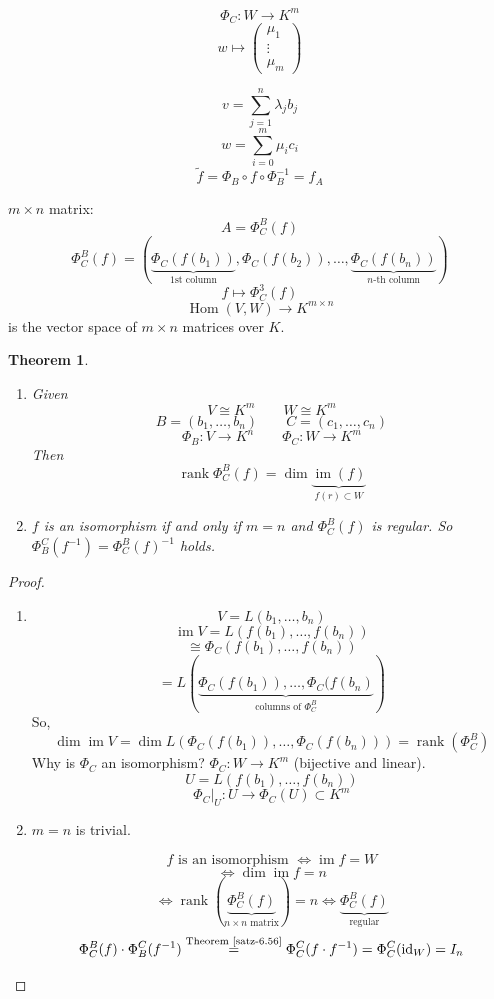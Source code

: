 \documentclass[a4paper,landscape,twocolumn]{article}
\newtheorem{theorem}{Theorem}
\DeclareMathOperator\Hom{Hom} %
\DeclareMathOperator\image{im} %
\DeclareMathOperator\rank{rank} %
\begin{document}
\[ \Phi_C: W \to K^m \]
\[ w \mapsto \begin{pmatrix} \mu_1 \\ \vdots \\ \mu_m \end{pmatrix} \]

\[ v = \sum_{j=1}^n \lambda_j b_j \]
\[ w = \sum_{i=0}^m \mu_i c_i \]
\[ \tilde{f} = \Phi_B \circ f \circ \Phi_B^{-1} = f_A \]

$m\times n$ matrix:
\[ A = \Phi_C^B(f) \]
\[
  \Phi_C^B(f) = \left(
    \underbrace{\Phi_C(f(b_1))}_{\text{1st column}},
    \Phi_C(f(b_2)),
    \ldots,
    \underbrace{\Phi_C(f(b_n))}_{\text{$n$-th column}}
  \right)
\]
\[ f \mapsto \Phi_C^3(f) \]
\[ \Hom(V, W) \to K^{m\times n} \]
is the vector space of $m\times n$ matrices over $K$.

\begin{theorem}
  \label{satz-6.57}
  \begin{enumerate}
    \item
      Given
      \[ V \cong K^m \qquad W \cong K^m \]
      \[ B = (b_1, \ldots, b_n)  \qquad  C = (c_1, \ldots, c_n)  \]
      \[ \Phi_B:  V \to K^n \qquad \Phi_C: W \to K^m \]
      Then
      \[ \rank{\Phi_C^B(f)} = \dim{\underbrace{\image(f)}_{f(r) \subset W}} \]
    \item
      $f$ is an isomorphism if and only if $m = n$ and $\Phi_C^B(f)$ is regular.
      So $\Phi_B^C(f^{-1}) = \Phi_C^B(f)^{-1}$ holds.
  \end{enumerate}
\end{theorem}
\begin{proof}
  \begin{enumerate}
    \item
      \[ V = L(b_1, \ldots, b_n) \]
      \[ \image{V} = L(f(b_1), \ldots, f(b_n)) \]
      \[ \cong \Phi_C(f(b_1), \ldots, f(b_n)) \]
      \[ = L(\underbrace{\Phi_C(f(b_1)), \ldots, \Phi_C(f(b_n)}_{\text{columns of } \Phi_C^B}) \]
      So,
      \[ \dim{\image{V}} = \dim{L(\Phi_C(f(b_1)), \ldots, \Phi_C(f(b_n)))} = \rank(\Phi_C^B) \]
      Why is $\Phi_C$ an isomorphism? $\Phi_C: W \to K^m$ (bijective and linear).
      \[ U = L(f(b_1), \ldots, f(b_n)) \]
      \[ \left.\Phi_C\right|_U: U \to \Phi_C(U) \subset K^m \]
    \item
      $m = n$ is trivial.

      \[ f \text{ is an isomorphism } \Leftrightarrow \image{f} = W \]
      \[ \Leftrightarrow \dim{\image{f}} = n \]
      \[
        \Leftrightarrow
        \rank\left(\underbrace{\Phi_C^B(f)}_{n\times n \text{ matrix}}\right)
        = n \Leftrightarrow \underbrace{\Phi_C^B(f)}_{\text{regular}}
      \] \[
        \Phi_C^B(f) \cdot \Phi_B^C(f^{-1})
          \overset{\text{Theorem~\ref{satz-6.56}}}{=} \Phi_C^C(f \cdot f^{-1})
          = \Phi_C^C(\text{id}_W)
          = I_n
      \]
  \end{enumerate}
\end{proof}
\end{document}
